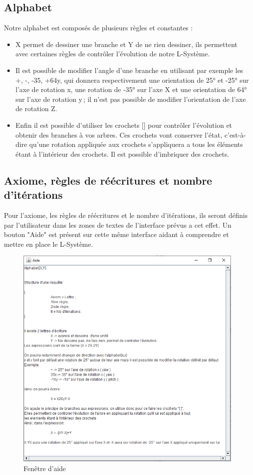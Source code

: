 \subsection{Alphabet}
\label{sec:Alphabet}
Notre alphabet est composés de plusieurs règles et constantes :\\
\begin{itemize}
    \item X permet de dessiner une branche et Y de ne rien dessiner, ils permettent avec certaines règles de contrôler l'évolution de notre L-Système.
    \item Il est possible de modifier l'angle d'une branche en utilisant par exemple les +, -, -35, +64y, qui donnera respectivement une orientation de 25° et -25° sur l'axe de rotation x, une rotation de -35° sur l'axe X et une orientation de 64° sur l'axe de rotation y ; il n'est pas possible de modifier l'orientation de l'axe de rotation Z.
\item Enfin il est possible d'utiliser les crochets [] pour contrôler l'évolution et obtenir des branches à vos arbres. Ces crochets vont conserver l'état, c’est-à-dire qu'une rotation appliquée aux crochets s'appliquera a tous les éléments étant à l'intérieur des crochets. Il est possible d'imbriquer des crochets.\\
\end{itemize}

\subsection{Axiome, règles de réécritures et nombre d'itérations}
Pour l'axiome, les règles de réécritures et le nombre d'itérations, ils seront définis par l'utilisateur dans les zones de textes de l'interface prévus a cet effet.
Un bouton "Aide" est présent sur cette même interface aidant à comprendre et mettre en place le L-Système.

\begin{figure}[h!]
\centering
\includegraphics[width=0.8\linewidth]{pics/aideGUI.png}
\caption{Fenêtre d'aide}
\label{fig:help_frame}
\end{figure}
